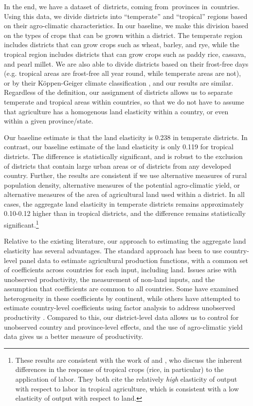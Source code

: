 \documentclass[11pt]{article}
\begin{document}
In the end, we have a dataset of\districts \ districts, coming from\provinces \ provinces in\countries \ countries. Using this data, we divide districts into ``temperate'' and ``tropical'' regions based on their agro-climatic characteristics. In our baseline, we make this division based on the types of crops that can be grown within a district. The temperate region includes districts that can grow crops such as wheat, barley, and rye, while the tropical region includes districts that can grow crops such as paddy rice, cassava, and pearl millet. We are also able to divide districts based on their frost-free days (e.g. tropical areas are frost-free all year round, while temperate areas are not), or by their K{\"o}ppen-Geiger climate classification \citep{kottek2006}, and our results are similar. Regardless of the definition, our assignment of districts allows us to separate temperate and tropical areas within countries, so that we do not have to assume that agriculture has a homogenous land elasticity within a country, or even within a given province/state. 

Our baseline estimate is that the land elasticity is 0.238 in temperate districts. In contrast, our baseline estimate of the land elasticity is only 0.119 for tropical districts. The difference is statistically significant, and is robust to the exclusion of districts that contain large urban areas or of districts from any developed country. Further, the results are consistent if we use alternative measures of rural population density, alternative measures of the potential agro-climatic yield, or alternative measures of the area of agricultural land used within a district. In all cases, the aggregate land elasticity in temperate districts remains approximately 0.10-0.12 higher than in tropical districts, and the difference remains statistically significant.\footnote{These results are consistent with the work of \citet{Ruthenberg:1976zr} and \citet{bray1994}, who discuss the inherent differences in the response of tropical crops (rice, in particular) to the application of labor. They both cite the relatively \textit{high} elasticity of output with respect to labor in tropical agriculture, which is consistent with a low elasticity of output with respect to land.} 

Relative to the existing literature, our approach to estimating the aggregate land elasticity has several advantages. The standard approach has been to use country-level panel data \citep{Hayami:1970ly,Hayami:1985cr,cpr1997,mm2001,Mundlak:2000dq,mbl2012,et2013mango} to estimate agricultural production functions, with a common set of coefficients across countries for each input, including land. Issues arise with unobserved productivity, the measurement of non-land inputs, and the assumption that coefficients are common to all countries. Some have examined heterogeneity in these coefficients \citep{gg2003,Wiebe2003Resource-Qualit} by continent, while others have attempted to estimate country-level coefficients using factor analysis to address unobserved productivity \citep{et2013mango,ev2016clim}. Compared to this, our district-level data allows us to control for unobserved country and province-level effects, and the use of agro-climatic yield data gives us a better measure of productivity.
\end{document}
